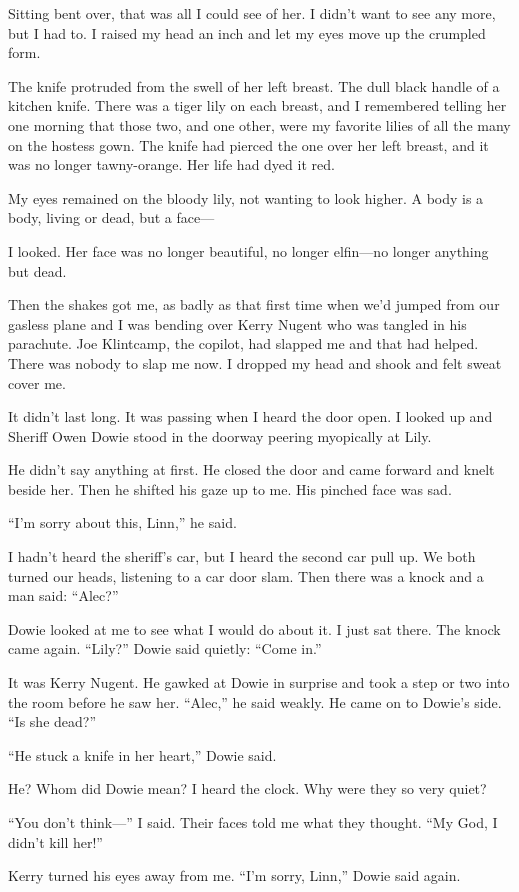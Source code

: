 {Sitting bent over, that was all I could see of her. I didn’t want to see any more, but I had to. I raised my head an inch and let my eyes move up the crumpled form.

The knife protruded from the swell of her left breast. The dull black handle of a kitchen knife. There was a tiger lily on each breast, and I remembered telling her one morning that those two, and one other, were my favorite lilies of all the many on the hostess gown. The knife had pierced the one over her left breast, and it was no longer tawny-orange. Her life had dyed it red.

My eyes remained on the bloody lily, not wanting to look higher. A body is a body, living or dead, but a face—

I looked. Her face was no longer beautiful, no longer elfin—no longer anything but dead.

Then the shakes got me, as badly as that first time when we’d jumped from our gasless plane and I was bending over Kerry Nugent who was tangled in his parachute. Joe Klintcamp, the copilot, had slapped me and that had helped. There was nobody to slap me now. I dropped my head and shook and felt sweat cover me.

It didn’t last long. It was passing when I heard the door open. I looked up and Sheriff Owen Dowie stood in the doorway peering myopically at Lily.

He didn’t say anything at first. He closed the door and came forward and knelt beside her. Then he shifted his gaze up to me. His pinched face was sad.

“I’m sorry about this, Linn,” he said.

I hadn’t heard the sheriff’s car, but I heard the second car pull up. We both turned our heads, listening to a car door slam. Then there was a knock and a man said: “Alec?”

Dowie looked at me to see what I would do about it. I just sat there. The knock came again. “Lily?” Dowie said quietly: “Come in.”

It was Kerry Nugent. He gawked at Dowie in surprise and took a step or two into the room before he saw her. “Alec,” he said weakly. He came on to Dowie’s side. “Is she dead?”

“He stuck a knife in her heart,” Dowie said.

He? Whom did Dowie mean? I heard the clock. Why were they so very quiet?

“You don’t think—” I said. Their faces told me what they thought. “My God, I didn’t kill her!”

Kerry turned his eyes away from me. “I’m sorry, Linn,” Dowie said again.

}

